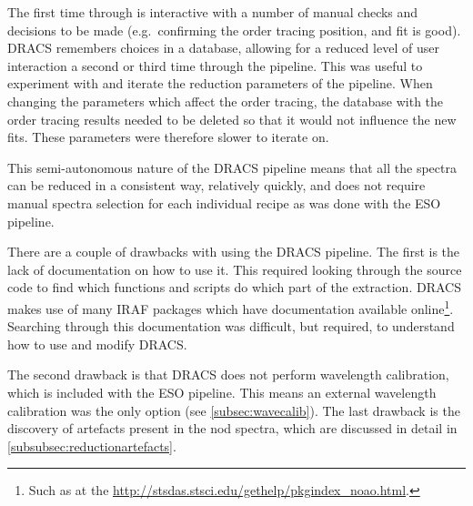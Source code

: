 The first time through is interactive with a number of manual checks and decisions to be made (e.g.\ confirming the order tracing position, and fit is good).
{DRACS} remembers choices in a database, allowing for a reduced level of user interaction a second or third time through the pipeline.
This was useful to experiment with and iterate the reduction parameters of the pipeline.
When changing the parameters which affect the order tracing, the database with the order tracing results needed to be deleted so that it would not influence the new fits.
These parameters were therefore slower to iterate on.

This semi-autonomous nature of the {DRACS} pipeline means that all the spectra can be reduced in a consistent way, relatively quickly, and does not require manual spectra selection for each individual recipe as was done with the {ESO} pipeline.

There are a couple of drawbacks with using the {DRACS} pipeline.
The first is the lack of documentation on how to use it.
This required looking through the source code to find which functions and scripts do which part of the extraction.
{DRACS} makes use of many {IRAF} packages which have documentation available online\footnote{Such as at the \href{Space Telescope Science Institute}{http://stsdas.stsci.edu/gethelp/pkgindex\_noao.html}.}.
Searching through this documentation was difficult, but required, to understand how to use and modify {DRACS}.

The second drawback is that {DRACS} does not perform wavelength calibration, which is included with the {ESO} pipeline.
This means an external wavelength calibration was the only option (see \cref{subsec:wavecalib}).
The last drawback is the discovery of artefacts present in the nod spectra, which are discussed in detail in \cref{subsubsec:reductionartefacts}.

